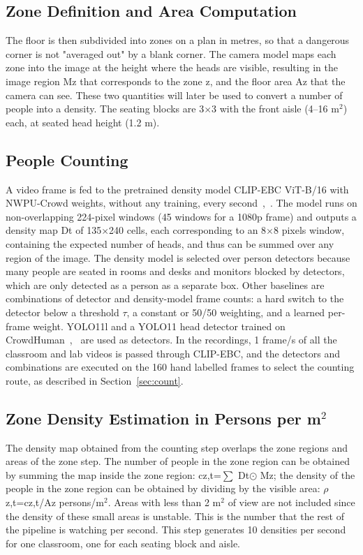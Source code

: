 \documentclass[conference]{IEEEtran}
\newcommand{\pmsq}{persons/m$^2$}
\begin{document}
\subsection{Zone Definition and Area Computation}
The floor is then subdivided into zones on a plan in metres, so that a dangerous corner is not "averaged out" by a blank corner. The camera model maps each zone into the image at the height where the heads are visible, resulting in the image region Mz that corresponds to the zone z, and the floor area Az that the camera can see. These two quantities will later be used to convert a number of people into a density. The seating blocks are 3$\times$3 with the front aisle (4--16 m$^{2}$) each, at seated head height (1.2 m).

\subsection{People Counting}
A video frame is fed to the pretrained density model CLIP-EBC ViT-B/16 with NWPU-Crowd weights, without any training, every second~\cite{ma2025clipebc},~\cite{wang2021nwpu}. The model runs on non-overlapping 224-pixel windows (45 windows for a 1080p frame) and outputs a density map Dt of 135$\times$240 cells, each corresponding to an 8$\times$8 pixels window, containing the expected number of heads, and thus can be summed over any region of the image. The density model is selected over person detectors because many people are seated in rooms and desks and monitors blocked by detectors, which are only detected as a person as a separate box. Other baselines are combinations of detector and density-model frame counts: a hard switch to the detector below a threshold $\tau$, a constant or 50/50 weighting, and a learned per-frame weight. YOLO11l and a YOLO11 head detector trained on CrowdHuman~\cite{yolo11},~\cite{shao2018crowdhuman} are used as detectors. In the recordings, 1 frame/s of all the classroom and lab videos is passed through CLIP-EBC, and the detectors and combinations are executed on the 160 hand labelled frames to select the counting route, as described in Section~\ref{sec:count}.

\subsection{Zone Density Estimation in Persons per \texorpdfstring{m$^2$}{m2}}
The density map obtained from the counting step overlaps the zone regions and areas of the zone step. The number of people in the zone region can be obtained by summing the map inside the zone region: cz,t=$\sum$ Dt$\odot$ Mz; the density of the people in the zone region can be obtained by dividing by the visible area: $\rho$z,t=cz,t/Az \pmsq{}. Areas with less than 2 m$^{2}$ of view are not included since the density of these small areas is unstable. This is the number that the rest of the pipeline is watching per second. This step generates 10 densities per second for one classroom, one for each seating block and aisle.
\end{document}
